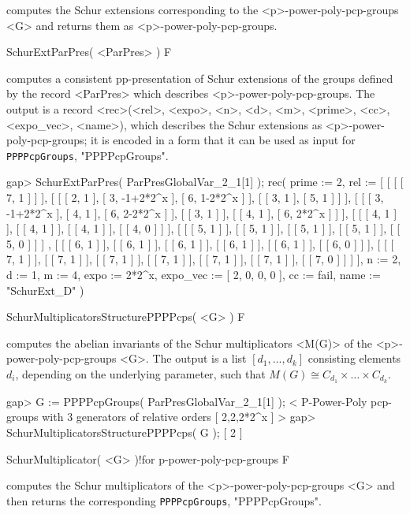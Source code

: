 computes the Schur extensions corresponding to the <p>-power-poly-pcp-groups
<G> and returns them as <p>-power-poly-pcp-groups.

\>SchurExtParPres( <ParPres> ) F

computes a consistent pp-presentation of Schur extensions of the 
groups defined by the record <ParPres> which describes 
<p>-power-poly-pcp-groups. The output is a record 
<rec>(<rel>, <expo>, <n>, <d>, <m>, <prime>, <cc>, <expo\_vec>, <name>), 
which describes the Schur extensions as <p>-power-poly-pcp-groups; it is 
encoded in a form that it can be used as input for 
{\tt PPPPcpGroups},
"PPPPcpGroups".

\beginexample
gap> SchurExtParPres( ParPresGlobalVar_2_1[1] );
rec( prime := 2, 
  rel := [ [ [ [ 7, 1 ] ] ], [ [ [ 2, 1 ], [ 3, -1+2*2^x ], [ 6, 1-2*2^x ] ], 
          [ [ 3, 1 ], [ 5, 1 ] ] ], 
      [ [ [ 3, -1+2*2^x ], [ 4, 1 ], [ 6, 2-2*2^x ] ], [ [ 3, 1 ] ], 
          [ [ 4, 1 ], [ 6, 2*2^x ] ] ], 
      [ [ [ 4, 1 ] ], [ [ 4, 1 ] ], [ [ 4, 1 ] ], [ [ 4, 0 ] ] ], 
      [ [ [ 5, 1 ] ], [ [ 5, 1 ] ], [ [ 5, 1 ] ], [ [ 5, 1 ] ], [ [ 5, 0 ] ] ]
        , 
      [ [ [ 6, 1 ] ], [ [ 6, 1 ] ], [ [ 6, 1 ] ], [ [ 6, 1 ] ], [ [ 6, 1 ] ], 
          [ [ 6, 0 ] ] ], 
      [ [ [ 7, 1 ] ], [ [ 7, 1 ] ], [ [ 7, 1 ] ], [ [ 7, 1 ] ], [ [ 7, 1 ] ], 
          [ [ 7, 1 ] ], [ [ 7, 0 ] ] ] ], n := 2, d := 1, m := 4, 
  expo := 2*2^x, expo_vec := [ 2, 0, 0, 0 ], cc := fail, name := "SchurExt_D" 
 )
\endexample


\>SchurMultiplicatorsStructurePPPPcps( <G> ) F

computes the abelian invariants of the Schur multiplicators <M(G)> of the
<p>-power-poly-pcp-groups <G>. The output is a list $[d_1, ..., d_k]$
consisting elements $d_i$, depending on the underlying parameter, such that 
$M(G) \cong C_{d_1} \times \ldots \times C_{d_k}$.

\beginexample
gap> G := PPPPcpGroups( ParPresGlobalVar_2_1[1] );
< P-Power-Poly pcp-groups with 3 generators of relative orders [ 2,2,2*2^x ] >
gap> SchurMultiplicatorsStructurePPPPcps( G );
[ 2 ]
\endexample

\>SchurMultiplicator( <G> )!{for p-power-poly-pcp-groups} F

computes the Schur multiplicators of the <p>-power-poly-pcp-groups <G> and 
then returns the corresponding 
{\tt PPPPcpGroups},
"PPPPcpGroups".

